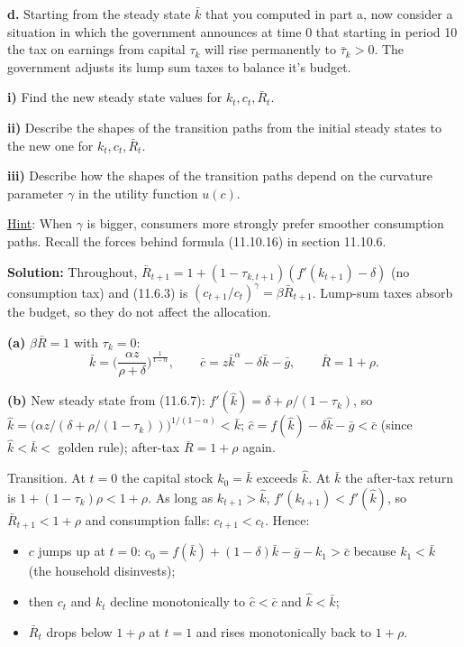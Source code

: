 \documentclass[12pt, letterpaper]{article}
\newcommand{\Rb}{\bar R}
\newcommand{\kb}{\bar k}
\newcommand{\cb}{\bar c}
\newcommand{\gb}{\bar g}
\begin{document}
\begin{tcolorbox}[oddbox,title={Exercise 11.7 \quad Capital taxes: unforeseen, foreseen, and the role of $\gamma$}]
\begin{tcolorbox}[questionbox]
\textbf{d.} Starting from the steady state $\bar k$ that you computed in part a, now consider a situation in which the
government announces at time 0 that starting in period 10 the tax on earnings from capital $\tau_k$ will rise
permanently to $\bar\tau_k>0$. The government adjusts its lump sum taxes to balance it's budget.

\quad\textbf{i)} Find the new steady state values for $k_t,c_t,\bar R_t$.

\quad\textbf{ii)} Describe the shapes of the transition paths from the initial steady states to the new one for
$k_t,c_t,\bar R_t$.

\quad\textbf{iii)} Describe how the shapes of the transition paths depend on the curvature parameter $\gamma$ in the
utility function $u(c)$.

\quad\underline{Hint}: When $\gamma$ is bigger, consumers more strongly prefer smoother consumption paths. Recall the
forces behind formula (11.10.16) in section 11.10.6.
\end{tcolorbox}

\textbf{Solution:} Throughout, $\Rb_{t+1}=1+(1-\tau_{k,t+1})(f'(k_{t+1})-\delta)$ (no consumption tax) and (11.6.3) is
$(c_{t+1}/c_t)^\gamma=\beta\Rb_{t+1}$. Lump-sum taxes absorb the budget, so they do not affect the allocation.

\textbf{(a)} $\beta\Rb=1$ with $\tau_k=0$:
\[
\kb=\Big(\frac{\alpha z}{\rho+\delta}\Big)^{\frac1{1-\alpha}},\qquad \cb=z\kb^\alpha-\delta\kb-\gb,\qquad \Rb=1+\rho .
\]

\textbf{(b)} New steady state from (11.6.7): $f'(\hat k)=\delta+\rho/(1-\tau_k)$, so
$\hat k=\big(\alpha z/(\delta+\rho/(1-\tau_k))\big)^{1/(1-\alpha)}<\kb$; $\hat c=f(\hat k)-\delta\hat k-\gb<\cb$ (since
$\hat k<\kb<$ golden rule); after-tax $\Rb=1+\rho$ again.

Transition. At $t=0$ the capital stock $k_0=\kb$ exceeds $\hat k$. At $\kb$ the after-tax return is
$1+(1-\tau_k)\rho<1+\rho$. As long as $k_{t+1}>\hat k$, $f'(k_{t+1})<f'(\hat k)$, so $\Rb_{t+1}<1+\rho$ and consumption
falls: $c_{t+1}<c_t$. Hence:
\begin{itemize}[itemsep=2pt]
\item $c$ jumps up at $t=0$: $c_0=f(\kb)+(1-\delta)\kb-\gb-k_1>\cb$ because $k_1<\kb$ (the household disinvests);
\item then $c_t$ and $k_t$ decline monotonically to $\hat c<\cb$ and $\hat k<\kb$;
\item $\Rb_t$ drops below $1+\rho$ at $t=1$ and rises monotonically back to $1+\rho$.
\end{itemize}


\end{tcolorbox}
\end{document}
